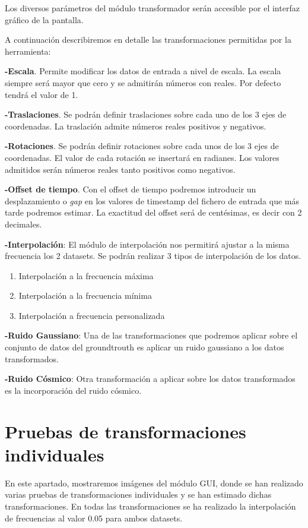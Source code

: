 Los diversos parámetros del módulo transformador serán accesible por el interfaz gráfico de la pantalla.

A continuación describiremos en detalle las transformaciones permitidas por la herramienta:

\textbf{-Escala}. Permite modificar los datos de entrada a nivel de escala. La escala siempre será mayor que cero y se admitirán números con reales. Por defecto tendrá el valor de 1. 

\textbf{-Traslaciones}. Se podrán definir traslaciones sobre cada uno de los 3 ejes de coordenadas. 
La traslación admite números reales positivos y negativos.

\textbf{-Rotaciones}. Se podrán definir rotaciones sobre cada unos de los 3 ejes de coordenadas. El valor de cada rotación se insertará en radianes. Los valores admitidos serán números reales tanto positivos como negativos. 

\textbf{-Offset de tiempo}. Con el offset de tiempo podremos introducir un desplazamiento o \textit{gap} en los valores de timestamp del fichero de entrada que más tarde podremos estimar. La exactitud del offset será de centésimas, es decir con 2 decimales.

\textbf{-Interpolación}: El módulo de interpolación nos permitirá ajustar a la misma frecuencia los 2 datasets. Se podrán realizar 3 tipos de interpolación de los datos.
\begin{enumerate}
	\item{Interpolación a la frecuencia máxima}
	\item{Interpolación a la frecuencia mínima}
	\item{Interpolación a frecuencia personalizada}
\end{enumerate}

\textbf{-Ruido Gaussiano}: Una de las transformaciones que podremos aplicar sobre el conjunto de datos del groundtrouth es aplicar un ruido gaussiano a los datos transformados.

\textbf{-Ruido Cósmico}: Otra transformación a aplicar sobre los datos transformados es la incorporación del ruido cósmico.


\section{Pruebas de transformaciones individuales}

En este apartado, mostraremos imágenes del módulo GUI, donde se han realizado varias pruebas de transformaciones individuales y se han estimado dichas transformaciones.
En todas las transformaciones se ha realizado la interpolación de frecuencias al valor 0.05 para ambos datasets.

